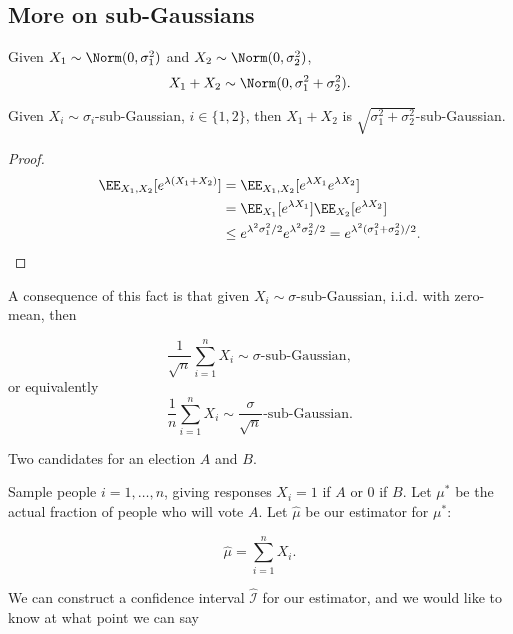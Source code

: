 \subsection{More on sub-Gaussians}

\begin{definition}

Given $X_1\sim \Norm(0,\sigma_1^2)$ and $X_2\sim \Norm(0,\sigma_2^2)$, 
\[X_1+X_2\sim \Norm(0, \sigma_1^2+\sigma_2^2).\] 
\end{definition}

\begin{theorem}

Given $X_i\sim \sigma_i$-sub-Gaussian, $i\in \{1,2\}$, then $X_1+X_2$ is $\sqrt{\sigma_1^2+\sigma_2^2}$-sub-Gaussian. 
\end{theorem}

\begin{proof}
\begin{align*}
	\EE_{X_1,X_2}[e^{\lambda(X_1+X_2)}] &= \EE_{X_1,X_2}[e^{\lambda X_1}e^{\lambda X_2}] \\
																			&= \EE_{X_1}[e^{\lambda X_1}]\EE_{X_2}[e^{\lambda X_2}] \\
																			&\leq e^{\lambda^2\sigma_1^2/2}e^{\lambda^2\sigma_2^2/2} = e^{\lambda^2(\sigma_1^2+\sigma_2^2)/2}.
\end{align*}
\end{proof}

A consequence of this fact is that given $X_i\sim \sigma$-sub-Gaussian, i.i.d. with zero-mean, then 

\[\frac{1}{\sqrt{n}}\sum_{i=1}^n X_i\sim \sigma\text{-sub-Gaussian},\] 
or equivalently 
\[\frac{1}{n}\sum_{i=1}^n X_i\sim \frac{\sigma}{\sqrt{n}}\text{-sub-Gaussian}.\] 

\begin{example}

Two candidates for an election $A$ and $B$.
\end{example}

Sample people $i=1, \hdots, n$, giving responses $X_i = 1$ if $A$ or $0$ if $B$. Let $\mu^*$ be the actual fraction of people who will vote $A$. Let $\hat{\mu}$ be our estimator for $\mu^*$: 

\[\hat{\mu} = \sum_{i=1}^n X_i.\] 

We can construct a confidence interval $\hat{\mathcal{I}}$ for our estimator, and we would like to know at what point we can say

